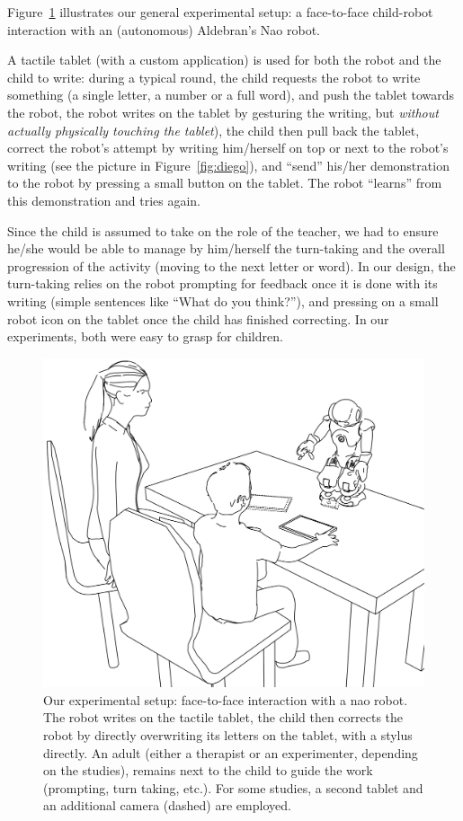 \documentclass{article}
\begin{document}
Figure~\ref{experimental_setup} illustrates our general experimental setup: a
face-to-face child-robot interaction with an (autonomous) Aldebran's Nao robot.

A tactile tablet (with a custom application) is used for both the robot and the
child to write: during a typical round, the child requests the robot to write
something (a single letter, a number or a full word), and push the tablet
towards the robot, the robot writes on the tablet by gesturing the writing, but
\emph{without actually physically touching the tablet}), the child then pull
back the tablet, correct the robot's attempt by writing him/herself on top or
next to the robot's writing (see the picture in Figure~\ref{fig:diego}), and
``send'' his/her demonstration to the robot by pressing a small button on the
tablet. The robot ``learns'' from this demonstration and tries again.

Since the child is assumed to take on the role of the teacher, we had to ensure
he/she would be able to manage by him/herself the turn-taking and the overall
progression of the activity (moving to the next letter or word). In our design,
the turn-taking relies on the robot prompting for feedback once it is done with
its writing (simple sentences like ``What do you think?''), and pressing on a
small robot icon on the tablet once the child has finished correcting. In our
experiments, both were easy to grasp for children.


\begin{figure}
    \centering
    \includegraphics[width=0.6\columnwidth]{experimental_setup}
    \caption{\small Our experimental setup: face-to-face interaction with a {\sc nao} robot.
        The robot writes on the tactile tablet, the child then corrects the
        robot by directly overwriting its letters on the tablet, with a stylus
        directly. An adult (either a therapist or an experimenter, depending on
        the studies), remains next to the child to guide the work (prompting,
        turn taking, etc.). For some studies, a second tablet and an additional
        camera (dashed) are employed.}

    \label{experimental_setup}
\end{figure}
\end{document}
